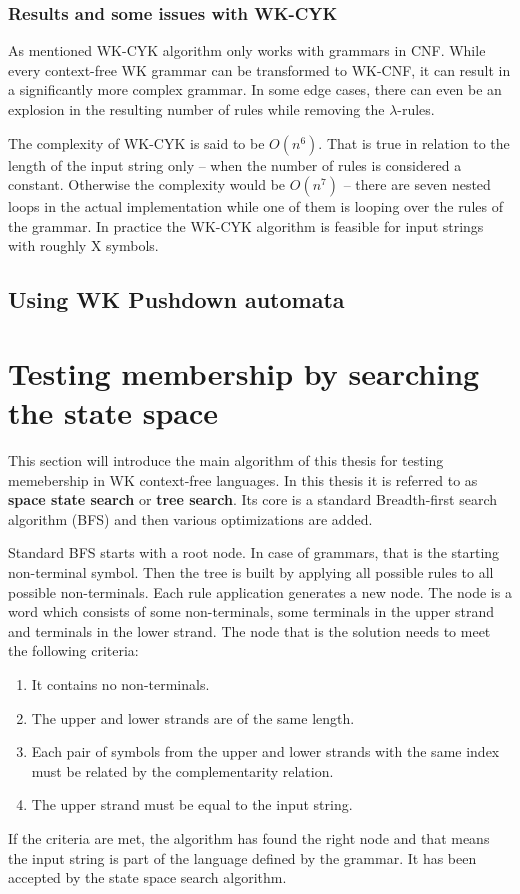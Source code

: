 \subsection{Results and some issues with WK-CYK}
As mentioned WK-CYK algorithm only works with grammars in CNF. While every context-free WK grammar can be transformed to WK-CNF, it can result in a significantly more complex grammar. In some edge cases, there can even be an explosion in the resulting number of rules while removing the $\lambda$-rules.

The complexity of WK-CYK is said to be $O(n^6)$. That is true in relation to the length of the input string only -- when the number of rules is considered a constant. Otherwise the complexity would be $O(n^7)$ -- there are seven nested loops in the actual implementation while one of them is looping over the rules of the grammar.
In practice the WK-CYK algorithm is feasible for input strings with roughly X symbols.


\section{Using WK Pushdown automata}

\chapter{Testing membership by searching the state space}
This section will introduce the main algorithm of this thesis for testing memebership in WK context-free languages. In this thesis it is referred to as \textbf{space state search} or \textbf{tree search}. Its core is a standard Breadth-first search algorithm (BFS) and then various optimizations are added.

Standard BFS starts with a root node. In case of grammars, that is the starting non-terminal symbol. Then the tree is built by applying all possible rules to all possible non-terminals. Each rule application generates a new node. The node is a word which consists of some non-terminals, some terminals in the upper strand and terminals in the lower strand. The node that is the solution needs to meet the following criteria:
\begin{enumerate}
  \item{It contains no non-terminals.}
  \item{The upper and lower strands are of the same length.}
  \item{Each pair of symbols from the upper and lower strands with the same index must be related by the complementarity relation.}
  \item{The upper strand must be equal to the input string.}
\end{enumerate}
If the criteria are met, the algorithm has found the right node and that means the input string is part of the language defined by the grammar. It has been accepted by the state space search algorithm.

